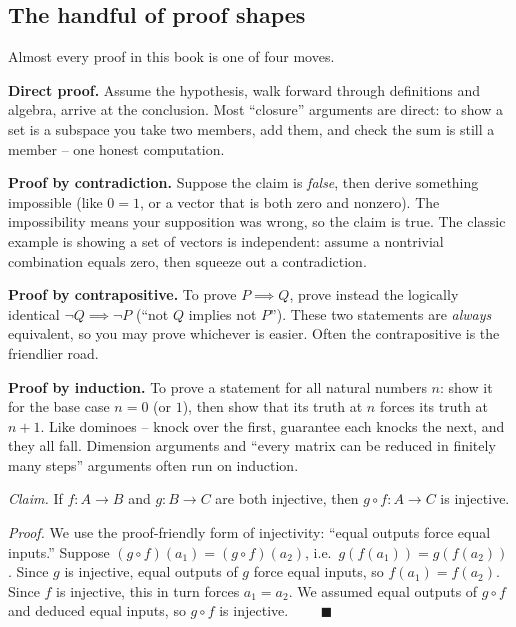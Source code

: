 \subsection{The handful of proof shapes}

Almost every proof in this book is one of four moves.

\textbf{Direct proof.} Assume the hypothesis, walk forward through definitions and
algebra, arrive at the conclusion. Most ``closure'' arguments are direct: to show a set is
a subspace you take two members, add them, and check the sum is still a member -- one
honest computation.

\textbf{Proof by contradiction.} Suppose the claim is \emph{false}, then derive something
impossible (like $0 = 1$, or a vector that is both zero and nonzero). The impossibility
means your supposition was wrong, so the claim is true. The classic example is showing a
set of vectors is independent: assume a nontrivial combination equals zero, then squeeze
out a contradiction.

\textbf{Proof by contrapositive.} To prove $P \implies Q$, prove instead the logically
identical $\lnot Q \implies \lnot P$ (``not $Q$ implies not $P$''). These two statements
are \emph{always} equivalent, so you may prove whichever is easier. Often the
contrapositive is the friendlier road.

\textbf{Proof by induction.} To prove a statement for all natural numbers $n$: show it for
the base case $n = 0$ (or $1$), then show that its truth at $n$ forces its truth at $n+1$.
Like dominoes -- knock over the first, guarantee each knocks the next, and they all fall.
Dimension arguments and ``every matrix can be reduced in finitely many steps'' arguments
often run on induction.

\begin{example}\label{ch38:directproof}
\emph{Claim.} If $f:A\to B$ and $g:B\to C$ are both injective, then $g\circ f : A \to C$
is injective.

\emph{Proof.} We use the proof-friendly form of injectivity: ``equal outputs force equal
inputs.'' Suppose $(g\circ f)(a_1) = (g\circ f)(a_2)$, i.e.\ $g(f(a_1)) = g(f(a_2))$. Since
$g$ is injective, equal outputs of $g$ force equal inputs, so $f(a_1) = f(a_2)$. Since $f$
is injective, this in turn forces $a_1 = a_2$. We assumed equal outputs of $g\circ f$ and
deduced equal inputs, so $g \circ f$ is injective. $\qquad\blacksquare$
\end{example}


